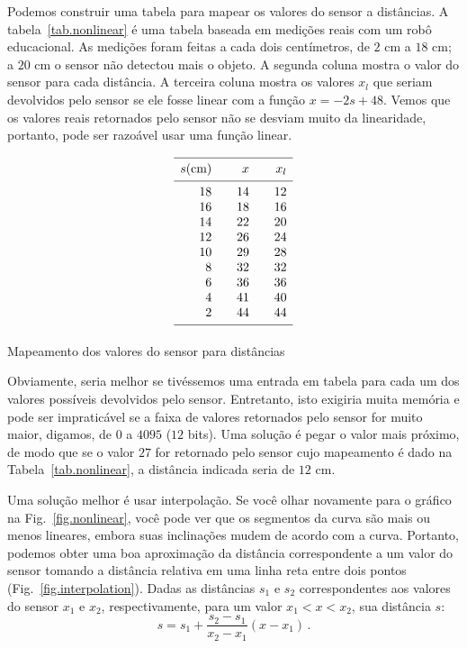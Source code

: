 Podemos construir uma tabela para mapear os valores do sensor a distâncias. A tabela~\ref{tab.nonlinear} é uma tabela baseada em medições reais com um robô educacional. As medições foram feitas a cada dois centímetros, de $2$ cm a $18$ cm; a $20$ cm o sensor não detectou mais o objeto. A segunda coluna mostra o valor do sensor para cada distância. A terceira coluna mostra os valores $x_l$ que seriam devolvidos pelo sensor se ele fosse linear com a função $x=-2s+48$. Vemos que os valores reais retornados pelo sensor não se desviam muito da linearidade, portanto, pode ser razoável usar uma função linear.

\begin{table}
\begin{displaymath}
\begin{array}{r@{\hspace{2em}}r@{\hspace{2em}}r}
\hline\noalign{\smallskip}
s \textrm{(cm)} & x & x_l\\
\noalign{\smallskip}\hline\noalign{\smallskip}
18 &14 & 12\\
16 &18 & 16\\
 14&22 & 20\\
 12&26 & 24\\
 10&29 & 28\\
 8 &32 & 32\\
 6 &36 & 36\\
 4 &41 & 40\\
 2 &44 & 44\\
\noalign{\smallskip}\hline\noalign{\smallskip}
\end{array}
\end{displaymath}
\caption{Mapeamento dos valores do sensor para distâncias}\label{tab.nonlinear}
\end{table}
Obviamente, seria melhor se tivéssemos uma entrada em tabela para cada um dos valores possíveis devolvidos pelo sensor. Entretanto, isto exigiria muita memória e pode ser impraticável se a faixa de valores retornados pelo sensor for muito maior, digamos, de $0$ a $4095$ ($12$ bits). Uma solução é pegar o valor mais próximo, de modo que se o valor $27$ for retornado pelo sensor cujo mapeamento é dado na Tabela~\ref{tab.nonlinear}, a distância indicada seria de $12$ cm.

Uma solução melhor é usar interpolação. Se você olhar novamente para o gráfico na Fig.~\ref{fig.nonlinear}, você pode ver que os segmentos da curva são mais ou menos lineares, embora suas inclinações mudem de acordo com a curva. Portanto, podemos obter uma boa aproximação da distância correspondente a um valor do sensor tomando a distância relativa em uma linha reta entre dois pontos (Fig.~\ref{fig.interpolation}). Dadas as distâncias $s_1$ e $s_2$ correspondentes aos valores do sensor $x_1$ e $x_2$, respectivamente, para um valor $x_1<x<x_2$, sua distância $s$:
\[
s = s_1 + \frac{s_2-s_1}{x_2-x_1}(x-x_1)\,.
\]


